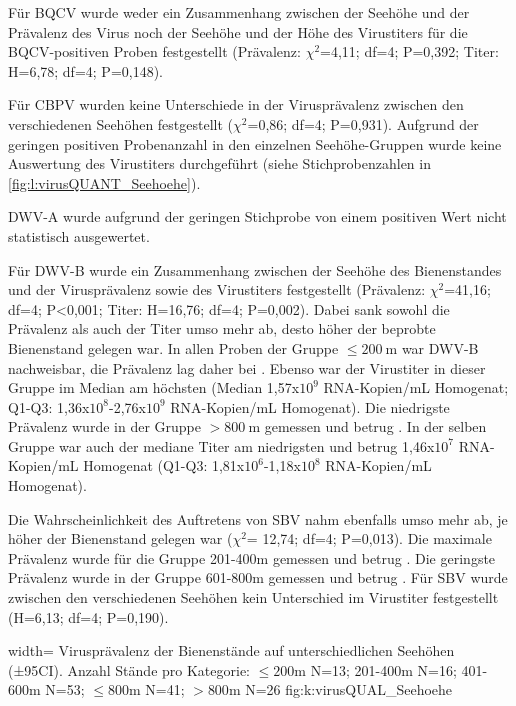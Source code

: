 Für BQCV wurde weder ein Zusammenhang zwischen der Seehöhe und der Prävalenz des Virus noch der Seehöhe und der Höhe des Virustiters für die BQCV-positiven Proben festgestellt (Prävalenz: $\chi^2$=4,11; df=4; P=0,392; Titer: H=6,78; df=4; P=0,148).

Für CBPV wurden keine Unterschiede in der Virusprävalenz zwischen den verschiedenen Seehöhen festgestellt ($\chi^2$=0,86; df=4; P=0,931). Aufgrund der geringen positiven Probenanzahl in den einzelnen Seehöhe-Gruppen wurde keine Auswertung des Virustiters durchgeführt (siehe Stichprobenzahlen in \cref{fig:l:virusQUANT_Seehoehe}).

DWV-A wurde aufgrund der geringen Stichprobe von einem positiven Wert nicht statistisch ausgewertet.

Für DWV-B wurde ein Zusammenhang zwischen der Seehöhe des Bienenstandes und der Virusprävalenz sowie des Virustiters festgestellt (Prävalenz: $\chi^2$=41,16; df=4; P<0,001; Titer: H=16,76; df=4; P=0,002). Dabei sank sowohl die Prävalenz als auch der Titer umso mehr ab, desto höher der beprobte Bienenstand gelegen war. In allen Proben der Gruppe $\leq \SI{200}{\meter}$ war DWV-B nachweisbar, die Prävalenz lag daher bei . Ebenso war der Virustiter in dieser Gruppe im Median am höchsten (Median 1,57x$10^9$ RNA-Kopien/\si{\milli\liter} Homogenat; Q1-Q3: 1,36x$10^8$-2,76x$10^9$ RNA-Kopien/\si{\milli\liter} Homogenat). Die niedrigste Prävalenz wurde in der Gruppe $> \SI{800}{\meter}$ gemessen und betrug . In der selben Gruppe war auch der mediane Titer am niedrigsten und betrug 1,46x$10^7$ RNA-Kopien/\si{\milli\liter} Homogenat (Q1-Q3: 1,81x$10^6$-1,18x$10^8$ RNA-Kopien/\si{\milli\liter} Homogenat).

Die Wahrscheinlichkeit des Auftretens von SBV nahm ebenfalls umso mehr ab, je höher der Bienenstand gelegen war ($\chi^2$= 12,74; df=4; P=0,013). Die maximale Prävalenz wurde für die Gruppe 201-400\si{\meter} gemessen und betrug . Die geringste Prävalenz wurde in der Gruppe 601-800\si{\meter} gemessen und betrug . Für SBV wurde zwischen den verschiedenen Seehöhen kein Unterschied im Virustiter festgestellt (H=6,13; df=4; P=0,190).

 
 
  {width=\textwidth} %
  {Virusprävalenz der Bienenstände auf unterschiedlichen Seehöhen (±95CI). Anzahl Stände pro Kategorie: $\leq200\si{\m}$ N=13; 201-400\si{\m} N=16; 401-600\si{\m} N=53; $\leq800\si{\m}$ N=41; $>800\si{\m}$ N=26} %
  {} %
  {fig:k:virusQUAL_Seehoehe} %
 
